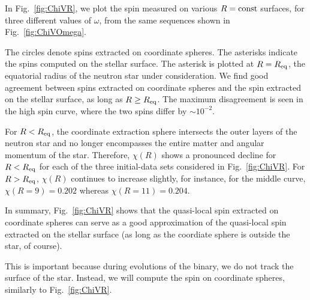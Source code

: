 {In Fig.~\ref{fig:ChiVR}, we plot the spin measured on various $R=\rm{const}$
surfaces, for three different values of $\omega$, from the same sequences
shown in Fig.~\ref{fig:ChiVOmega}.

The circles denote spins extracted on coordinate spheres.  The asterisks
indicate the spins computed on the stellar surface. The asterisk is
plotted at $R=R_{\rm eq}$, the equatorial radius of the neutron star
under consideration.  
We find good agreement between spins extracted on coordinate spheres and
the spin extracted on the stellar surface, as long as $R\ge R_{\rm eq}$. 
 The maximum disagreement is seen in the high spin curve, where
the two spins differ by $\sim 10^{-2}$.  

For $R<R_{\rm eq}$, the coordinate extraction sphere intersects the
outer layers of the neutron star and no longer encompasses the entire matter and angular
momentum of the star.  Therefore, $\chi(R)$ shows a pronounced decline
for $R<R_{\rm eq}$ for each of the three initial-data sets considered
in Fig.~\ref{fig:ChiVR}.  For $R>R_{\rm eq}$, $\chi(R)$ continues to
increase slightly, for instance, for the middle curve,
$\chi(R=9)=0.202$ whereas $\chi(R=11)=0.204$.

In summary, Fig.~\ref{fig:ChiVR} shows that the quasi-local spin
extracted on coordinate spheres can serve as a good approximation of
the quasi-local spin extracted on the stellar surface (as long as the
coordiate sphere is outside the star, of course).

This is important because during evolutions of the
binary, we do not track the surface of the star.
Instead, we will compute the spin on coordinate spheres, similarly to Fig.~\ref{fig:ChiVR}.

}
